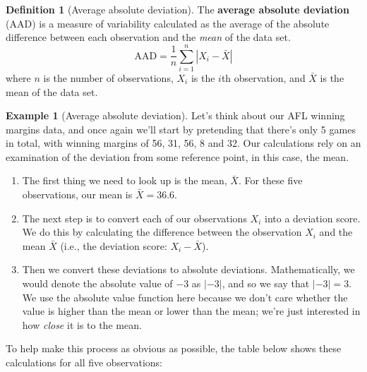 \documentclass[
  11pt,
]{book}
\providecommand{\tightlist}{%
  \setlength{\itemsep}{0pt}\setlength{\parskip}{0pt}}
\theoremstyle{definition}
\newtheorem{definition}{Definition}[chapter]
\theoremstyle{definition}
\newtheorem{example}{Example}[chapter]
\theoremstyle{definition}
\theoremstyle{definition}
\theoremstyle{remark}
\begin{document}
\begin{definition}[Average absolute deviation]
\protect\hypertarget{def:defAAD}{}\label{def:defAAD}The \textbf{average absolute deviation} (AAD) is a measure of variability calculated as the average of the absolute difference between each observation and the \emph{mean} of the data set.
\[
\text{AAD} = \frac{1}{n} \sum_{i=1}^n |X_i - \bar{X}|
\]
where \(n\) is the number of observations, \(X_i\) is the \(i\)th observation, and \(\bar{X}\) is the mean of the data set.
\end{definition}

\begin{example}[Average absolute deviation]
\protect\hypertarget{exm:exAAD}{}\label{exm:exAAD}Let's think about our AFL winning margins data, and once again we'll start by pretending that there's only 5 games in total, with winning margins of 56, 31, 56, 8 and 32. Our calculations rely on an examination of the deviation from some reference point, in this case, the mean.

\begin{enumerate}
\def\labelenumi{\arabic{enumi}.}
\tightlist
\item
  The first thing we need to look up is the mean, \(\bar{X}\). For these five observations, our mean is \(\bar{X} = 36.6\).
\item
  The next step is to convert each of our observations \(X_i\) into a deviation score. We do this by calculating the difference between the observation \(X_i\) and the mean \(\bar{X}\) (i.e., the deviation score: \(X_i - \bar{X}\)).
\item
  Then we convert these deviations to absolute deviations. Mathematically, we would denote the absolute value of \(-3\) as \(|-3|\), and so we say that \(|-3| = 3\). We use the absolute value function here because we don't care whether the value is higher than the mean or lower than the mean; we're just interested in how \emph{close} it is to the mean.
\end{enumerate}

To help make this process as obvious as possible, the table below shows these calculations for all five observations:

\begin{table}[H]
\centering
{}
\end{table}


\end{example}
\end{document}
